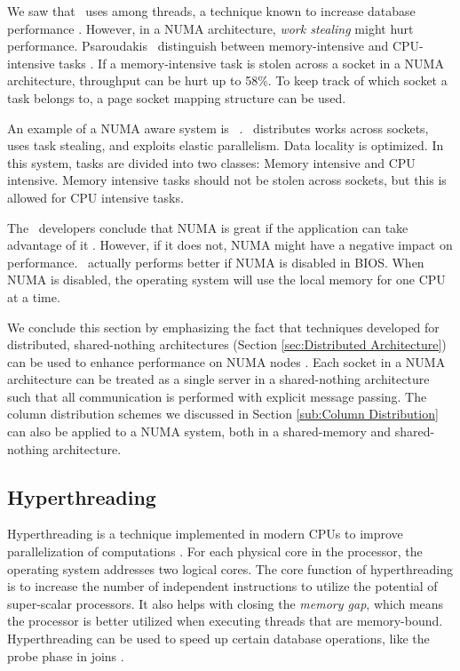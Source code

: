 We saw that \blink~uses  among threads, a technique known to increase database performance \cite{Barber2012-xt}. However, in a NUMA architecture, \textit{work stealing} might hurt performance. Psaroudakis \ea~distinguish between memory-intensive and CPU-intensive tasks \cite{Psaroudakis2015-lc}. If a memory-intensive task is stolen across a socket in a NUMA architecture, throughput can be hurt up to 58\%. To keep track of which socket a task belongs to, a page socket mapping structure can be used.

An example of a NUMA aware system is \hyper~\cite{Psaroudakis2014-ma, Psaroudakis2015-lc}. \hyper~distributes works across sockets,  uses task stealing, and exploits elastic parallelism. Data locality is optimized. In this system, tasks are divided into two classes: Memory intensive and CPU intensive. Memory intensive tasks should not be stolen across sockets, but this is allowed for CPU intensive tasks.

The \qlikview~developers conclude that NUMA is great if the application can take advantage of it \cite{Qlik2013-an}. However, if it does not, NUMA might have a negative impact on performance. \qlikview~actually performs better if NUMA is disabled in BIOS. When NUMA is disabled, the operating system will use the local memory for one CPU at a time.

We conclude this section by emphasizing the fact that techniques developed for distributed, shared-nothing architectures (Section \ref{sec:Distributed Architecture}) can be used to enhance performance on NUMA nodes \cite{Mukherjee2015-ul}. Each socket in a NUMA architecture can be treated as a single server in a shared-nothing architecture such that all communication is performed with explicit message passing. The column distribution schemes we discussed in Section \ref{sub:Column Distribution} can also be applied to a NUMA system, both in a shared-memory and shared-nothing architecture.

\subsection{Hyperthreading}
\label{sub:Hyperthreading}
Hyperthreading is a technique implemented in modern CPUs to improve parallelization of computations \cite{Wikipedia_contributors2015-yx}. For each physical core in the processor, the operating system addresses two logical cores. The core function of hyperthreading is to increase the number of independent instructions to utilize the potential of super-scalar processors. It also helps with closing the \textit{memory gap}, which means the processor is better utilized when executing threads that are memory-bound. Hyperthreading can be used to speed up certain database operations, like the probe phase in joins \cite{Barber2014-ey}.


